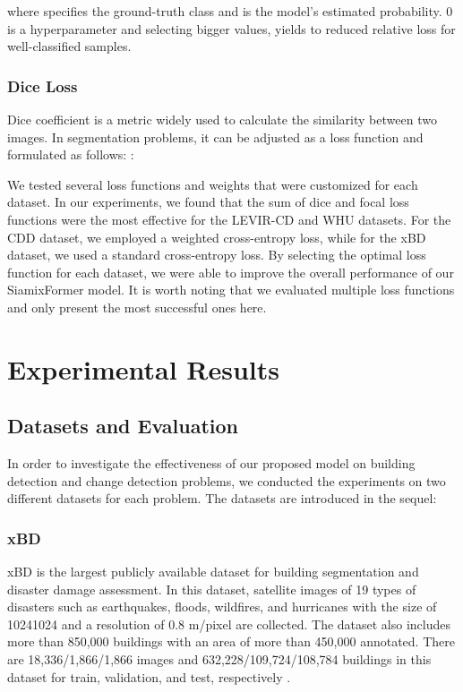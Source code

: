 \documentclass{article}
\begin{document}
where  specifies the ground-truth class and  is the model’s estimated probability.   0 is a hyperparameter and selecting bigger  values, yields to reduced relative loss for well-classified samples.
\subsubsection{Dice Loss}
Dice coefficient is a metric widely used to calculate the similarity between two images. In segmentation problems, it can be adjusted as a loss function and formulated as follows: \cite{sudre2017generalised}:


We tested several loss functions and weights that were customized for each dataset. In our experiments, we found that the sum of dice and focal loss functions were the most effective for the LEVIR-CD and WHU datasets. For the CDD dataset, we employed a weighted cross-entropy loss, while for the xBD dataset, we used a standard cross-entropy loss. By selecting the optimal loss function for each dataset, we were able to improve the overall performance of our SiamixFormer model. It is worth noting that we evaluated multiple loss functions and only present the most successful ones here.

\section{Experimental Results}           
\label{sec3}
\subsection{Datasets and Evaluation}
In order to investigate the effectiveness of our proposed model on building detection and change detection problems, we conducted the experiments on two different datasets for each problem. The datasets are introduced in the sequel:
\subsubsection{xBD}
xBD is the largest publicly available dataset for building segmentation and disaster damage assessment. In this dataset, satellite images of 19 types of disasters such as earthquakes, floods, wildfires, and hurricanes with the size of 10241024 and a resolution of 0.8 m/pixel are collected. The dataset also includes more than 850,000 buildings with an area of more than 450,000  annotated. There are 18,336/1,866/1,866 images and 632,228/109,724/108,784 buildings in this dataset for train, validation, and test, respectively \cite{gupta2019creating}.
\end{document}
